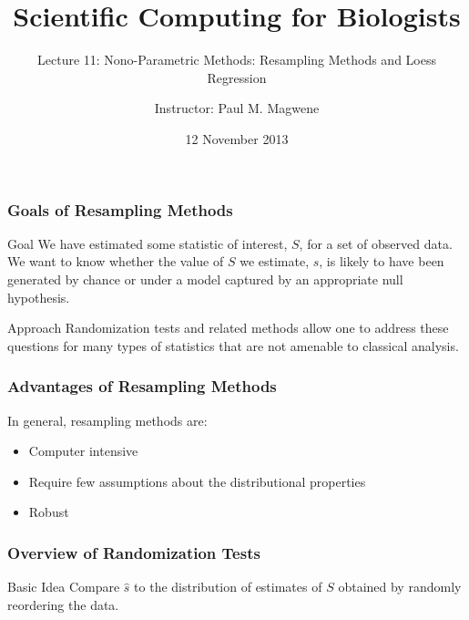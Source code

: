 \documentclass{beamer}
\title{Scientific Computing for Biologists}
\subtitle{Lecture 11: Nono-Parametric Methods: Resampling Methods and Loess Regression} %
\author{Instructor: Paul M. Magwene}
\date{12 November 2013}
\begin{document}
\begin{frame}
\titlepage
\end{frame}



\begin{frame}
  \frametitle{Goals of Resampling Methods}

\begin{block}{Goal}
We have estimated some statistic of interest, $S$, for a set of observed data. We want to know whether the value of $S$ we estimate, $\widehat{s}$, is likely to have been generated by chance or under a model captured by an appropriate null hypothesis.
\end{block}


\begin{block}{Approach}
Randomization tests and related methods allow one to address these questions for many types of statistics that are not amenable to classical analysis.
\end{block}



\end{frame}


\begin{frame}
  \frametitle{Advantages of Resampling Methods}


In general, resampling methods are:
\begin{itemize}
    \item Computer intensive
    \item Require few assumptions about the distributional properties
    \item Robust
\end{itemize}

\end{frame}

\begin{frame}
  \frametitle{Overview of Randomization Tests}

\begin{block}{Basic Idea}
Compare $\widehat{s}$ to the distribution of estimates of $S$ obtained by randomly reordering the data.
\end{block}

\end{frame}
\end{document}

